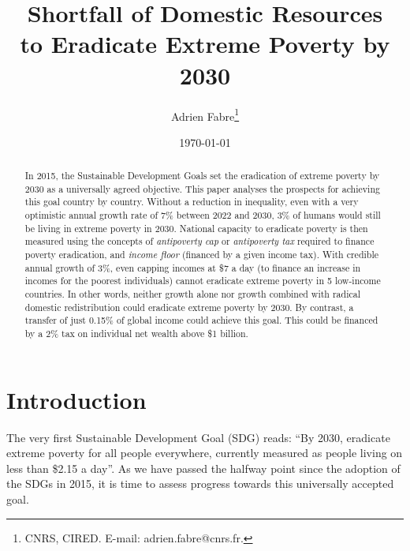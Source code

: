 \documentclass[12pt,english]{article}
\title{Shortfall of Domestic Resources\\ to Eradicate Extreme Poverty by 2030}
\author{Adrien Fabre\footnote{CNRS, CIRED. E-mail: adrien.fabre@cnrs.fr.}}
\date{\today} %
\makeatletter
\renewcommand\tableofcontents{%
    \@starttoc{toc}%
}
\makeatother
\begin{document}
\sloppy
\maketitle
\begin{abstract}
In 2015, the Sustainable Development Goals set the eradication of extreme poverty by 2030 as a universally agreed objective. This paper analyses the prospects for achieving this goal country by country. Without a reduction in inequality, even with a very optimistic annual growth rate of 7\% between 2022 and 2030, 3\% of humans would still be living in extreme poverty in 2030. National capacity to eradicate poverty is then measured using the concepts of \textit{antipoverty cap} or \textit{antipoverty tax} required to finance poverty eradication, and \textit{income floor} (financed by a given income tax). With credible annual growth of 3\%, even capping incomes at \$7 a day (to finance an increase in incomes for the poorest individuals) cannot eradicate extreme poverty in 5 low-income countries. In other words, neither growth alone nor growth combined with radical domestic redistribution could eradicate extreme poverty by 2030. By contrast, a transfer of just 0.15\% of global income could achieve this goal. This could be financed by a 2\% tax on individual net wealth above \$1 billion.

\end{abstract}
\clearpage
\tableofcontents

\section{Introduction}%

The very first Sustainable Development Goal (SDG) %
reads: ``By 2030, eradicate extreme poverty for all people everywhere, currently measured as people living on less than \$2.15 a day''. As we have passed the halfway point since the adoption of the SDGs in 2015, it is time to assess progress towards this universally accepted goal. 
\end{document}
